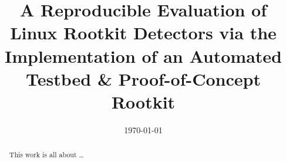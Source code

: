 \documentclass{ecsprogress}     %
\begin{document}
\frontmatter
\title      {A Reproducible Evaluation of Linux Rootkit Detectors via the Implementation of an Automated Testbed \& Proof-of-Concept Rootkit}
\addresses  {\groupname\\\deptname\\\univname}
\date       {\today}
\subject    {}
\keywords   {}
\maketitle
\begin{abstract}
This work is all about \dots
\end{abstract}
\tableofcontents
\listoffigures
\listoftables
\lstlistoflistings
{}
\mainmatter








\appendix
% 
\backmatter

\end{document}
